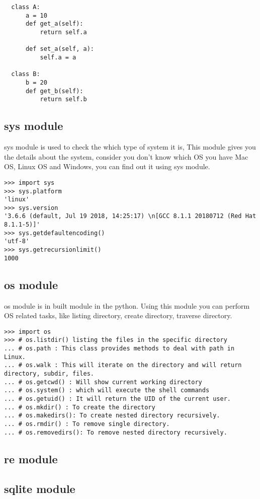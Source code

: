 \documentclass[letterpaper,12pt]{book}
\begin{document}
\begin{lstlisting}
  class A:
      a = 10
      def get_a(self):
          return self.a

      def set_a(self, a):
          self.a = a
          
  class B:
      b = 20
      def get_b(self):
          return self.b

\end{lstlisting}

\subsection{sys module}
sys module is used to check the which type of system it is, This module gives you the details about the system, consider you don't know which OS you have Mac OS, Linux OS and Windows, you can find out it using sys module.
\begin{lstlisting}
>>> import sys
>>> sys.platform
'linux'
>>> sys.version
'3.6.6 (default, Jul 19 2018, 14:25:17) \n[GCC 8.1.1 20180712 (Red Hat 8.1.1-5)]'
>>> sys.getdefaultencoding()
'utf-8'
>>> sys.getrecursionlimit()
1000
\end{lstlisting}
\subsection{os module}
os module is in built module in the python. Using this module you can perform OS related tasks, like listing directory, create directory, traverse directory.
\begin{lstlisting}
>>> import os
>>> # os.listdir() listing the files in the specific directory
... # os.path : This class provides methods to deal with path in Linux.
... # os.walk : This will iterate on the directory and will return directory, subdir, files.
... # os.getcwd() : Will show current working directory
... # os.system() : which will execute the shell commands
... # os.getuid() : It will return the UID of the current user.
... # os.mkdir() : To create the directory
... # os.makedirs(): To create nested directory recursively.
... # os.rmdir() : To remove single directory.
... # os.removedirs(): To remove nested directory recursively.
\end{lstlisting}
\subsection{re module}
\subsection{sqlite module}
\end{document}
